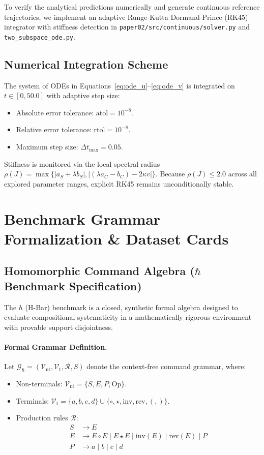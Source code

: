\documentclass{article}
\theoremstyle{plain}
\theoremstyle{definition}
\begin{document}
To verify the analytical predictions numerically and generate continuous reference trajectories, we implement an adaptive Runge-Kutta Dormand-Prince (RK45) integrator with stiffness detection in \texttt{paper02/src/continuous/solver.py} and \texttt{two\_subspace\_ode.py}.

\subsection{Numerical Integration Scheme}
The system of ODEs in Equations~\eqref{eq:ode_u}--\eqref{eq:ode_v} is integrated on $t \in [0, 50.0]$ with adaptive step size:
\begin{itemize}[noitemsep]
    \item Absolute error tolerance: $\text{atol} = 10^{-8}$.
    \item Relative error tolerance: $\text{rtol} = 10^{-8}$.
    \item Maximum step size: $\Delta t_{\text{max}} = 0.05$.
\end{itemize}

Stiffness is monitored via the local spectral radius $\rho(J) = \max\{ |a_S + \lambda b_S|, |(\lambda a_C - b_C) - 2\kappa v| \}$. Because $\rho(J) \le 2.0$ across all explored parameter ranges, explicit RK45 remains unconditionally stable.

\section{Benchmark Grammar Formalization \& Dataset Cards}
\label{sec:appendix_datasets}

\subsection{Homomorphic Command Algebra (\texorpdfstring{$\hbar$}{H-Bar} Benchmark Specification)}
The $\hbar$ (H-Bar) benchmark is a closed, synthetic formal algebra designed to evaluate compositional systematicity in a mathematically rigorous environment with provable support disjointness.

\paragraph{Formal Grammar Definition.}
Let $\mathcal{G}_{\hbar} = (\mathcal{V}_{\text{nt}}, \mathcal{V}_{\text{t}}, \mathcal{R}, S)$ denote the context-free command grammar, where:
\begin{itemize}[noitemsep]
    \item Non-terminals: $\mathcal{V}_{\text{nt}} = \{S, E, P, \text{Op}\}$.
    \item Terminals: $\mathcal{V}_{\text{t}} = \{a, b, c, d\} \cup \{\circ, \star, \text{inv}, \text{rev}, (, )\}$.
    \item Production rules $\mathcal{R}$:
    \begin{align}
        S &\to E \\
        E &\to E \circ E \mid E \star E \mid \text{inv}(E) \mid \text{rev}(E) \mid P \\
        P &\to a \mid b \mid c \mid d
    \end{align}
\end{itemize}
\end{document}
